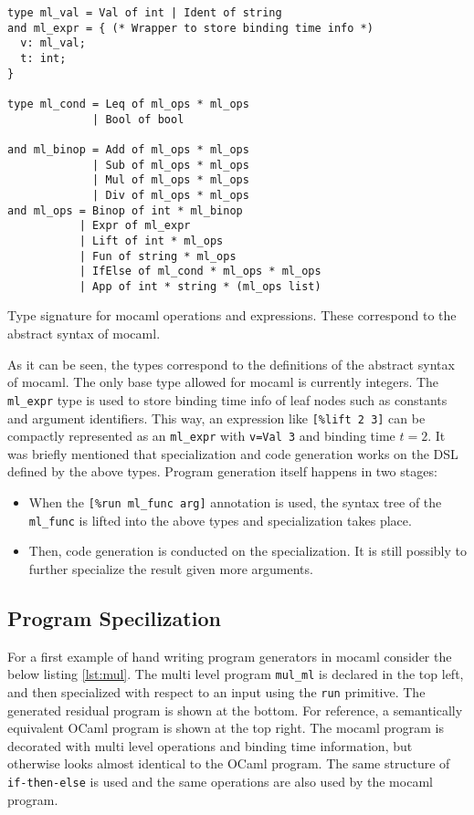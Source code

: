\begin{listing}[H]
\begin{verbatim}
type ml_val = Val of int | Ident of string
and ml_expr = { (* Wrapper to store binding time info *)
  v: ml_val;
  t: int;
}

type ml_cond = Leq of ml_ops * ml_ops
             | Bool of bool

and ml_binop = Add of ml_ops * ml_ops
             | Sub of ml_ops * ml_ops
             | Mul of ml_ops * ml_ops
             | Div of ml_ops * ml_ops
and ml_ops = Binop of int * ml_binop
           | Expr of ml_expr
           | Lift of int * ml_ops
           | Fun of string * ml_ops
           | IfElse of ml_cond * ml_ops * ml_ops
           | App of int * string * (ml_ops list)
\end{verbatim}
\caption{Type signature for mocaml operations and expressions. These correspond to the abstract syntax of mocaml.}
\label{lst:dsl}
\end{listing}

As it can be seen, the types correspond to the definitions of the abstract syntax of mocaml. The only base type allowed for mocaml is currently integers. The \texttt{ml\_expr} type is used to store binding time info of leaf nodes such as constants and argument identifiers. This way, an expression like \texttt{[\%lift 2 3]} can be compactly represented as an \texttt{ml\_expr} with \texttt{v=Val 3} and binding time $t=2$.
It was briefly mentioned that specialization and code generation works on the DSL defined by the above types. Program generation itself happens in two stages:
\begin{itemize}
\item When the \texttt{[\%run ml\_func arg]} annotation is used, the syntax tree of the \texttt{ml\_func} is lifted into the above types and specialization takes place.
  
\item Then, code generation is conducted on the specialization. It is still possibly to further specialize the result given more arguments.
\end{itemize}

\subsection{Program Specilization}

For a first example of hand writing program generators in mocaml consider the below listing \ref{lst:mul}. The multi level program \texttt{mul\_ml} is declared in the top left, and then specialized with respect to an input using the \texttt{run} primitive. The generated residual program is shown at the bottom. For reference, a semantically equivalent OCaml program is shown at the top right. The mocaml program is decorated with multi level operations and binding time information, but otherwise looks almost identical to the OCaml program. The same structure of \texttt{if-then-else} is used and the same operations are also used by the mocaml program.

